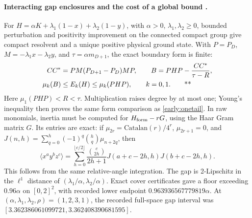 \paragraph{Interacting gap enclosures and the cost of a global bound \workstar.}
For \(H=\alpha K+\lambda_1(1-x)+\lambda_2(1-y)\), with
\(\alpha>0\), \(\lambda_1,\lambda_2\ge0\), bounded perturbation and
positivity improvement on the connected compact group give compact resolvent
and a unique positive physical ground state.  With \(P=P_D\),
\(M=-\lambda_1x-\lambda_2y\), and \(\tau=\alpha m_{D+1}\), the exact
boundary form is finite:
\begin{equation}
 \begin{aligned}
 CC^*&=PM(P_{D+1}-P_D)MP,\qquad
 B=PHP-\frac{CC^*}{\tau-R},\\
 \mu_k(B)&\le E_k(H)\le\mu_k(PHP),\qquad k=0,1.
 \qquad\text{**}
 \end{aligned}\label{early:twotail}
\end{equation}
Here \(\mu_1(PHP)<R<\tau\).  Multiplication raises degree by at most one;
Young's inequality then proves the same form comparison as
\eqref{early:onetail}.  In raw monomials, inertia must be computed for
\(H_{\rm form}-rG\), using the Haar Gram matrix \(G\).  Its entries are exact:
if \(\mu_{2r}=\mathrm{Catalan}(r)/4^r\), \(\mu_{2r+1}=0\), and
\(J(n,h)=\sum_{q=0}^h(-1)^q\binom hq\mu_{n+2q}\), then
\begin{equation}
 \langle x^ay^bz^c\rangle=
 \sum_{h=0}^{\lfloor c/2\rfloor}\frac{\binom c{2h}}{2h+1}
 J(a+c-2h,h)J(b+c-2h,h).
 \label{early:moments}
\end{equation}
This follows from the same relative-angle integration.  The gap is
2-Lipschitz in the \(\ell^1\) distance of \((\lambda_1/\alpha,\lambda_2/\alpha)\).
Exact cover certificates gave a floor exceeding \(0.96\alpha\) on
\([0,2]^2\), with recorded lower endpoint \(0.963936567779819\alpha\).
At \((\alpha,\lambda_1,\lambda_2,\rho)=(1,2,3,1)\), the recorded full-space
gap interval was \([3.362386061099721,3.362408390681595]\).

